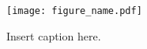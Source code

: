 













\begin{figure}
\centering
\texttt{[image: figure\_name.pdf]}
\caption{Insert caption here.}
\label{figure_label}
\end{figure}